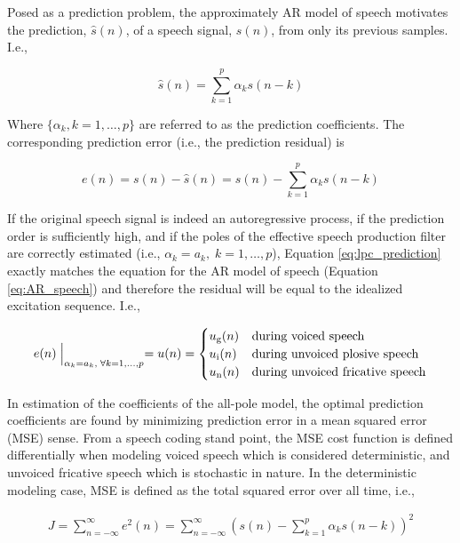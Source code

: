 Posed as a prediction problem, the approximately AR model of speech motivates the prediction, $\hat{s}(n)$, of a speech signal, $s(n)$, from only its previous samples. I.e.,

\begin{equation}
	\hat{s}(n) = \sum_{k=1}^{p}\alpha_k s(n-k) \label{eq:lpc_prediction}
\end{equation}

\noindent
Where $\{\alpha_k, k=1,\dots,p\}$ are referred to as the prediction coefficients. The corresponding prediction error (i.e., the prediction residual) is

\begin{equation}
	e(n)= s(n) - \hat{s}(n) =  s(n)  - \sum_{k=1}^{p}\alpha_k s(n-k) \label{eq:lpc_error}
\end{equation}


If the original speech signal is indeed an autoregressive process, if the prediction order is sufficiently high, and if the poles of the effective speech production filter are correctly estimated (i.e., $\alpha_k=a_k, \; k=1,\dots,p$), Equation \ref{eq:lpc_prediction} exactly matches the equation for the AR model of speech (Equation \ref{eq:AR_speech}) and therefore the residual will be equal to the idealized excitation sequence. I.e., 

\begin{equation}
	e(n)\Bigm|_{\alpha_k=a_k, \; \forall k=1,\dots,p} = u(n) = 
	\begin{cases} 
		u_\mathrm{g}(n) & \text{during voiced speech} \\
		u_\mathrm{i}(n)  & \text{during unvoiced plosive speech} \\
		u_\mathrm{n}(n) & \text{during unvoiced fricative speech} \\
	\end{cases}
\end{equation}

In estimation of the coefficients of the all-pole model, the optimal prediction coefficients are found by minimizing prediction error in a mean squared error (MSE) sense. From a speech coding stand point, the MSE cost function is defined differentially when modeling voiced speech which is considered deterministic, and unvoiced fricative speech which is stochastic in nature. In the deterministic modeling case, MSE is defined as the total squared error over all time, i.e.,

\begin{eqnarray}
	J = \sum_{n=-\infty}^{\infty}e^2(n) = \sum_{n=-\infty}^{\infty} \left(s(n)  - \sum_{k=1}^{p}\alpha_k s(n-k)\right) ^2 \label{eq:lp_mse_deterministic}
\end{eqnarray}


